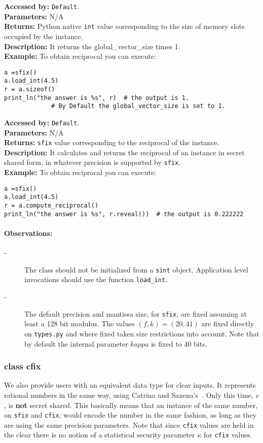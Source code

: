 		
			\textbf{Accessed by:} \verb|Default|.		 \\
			\textbf{Parameters:} N/A \\
			\textbf{Returns:}
				 Python native \verb|int| value corresponding to the size of memory slots occupied by the instance. \\
			\textbf{Description:}
				It returns the global_vector_size times 1. \\
	     	\textbf{Example:}
    		    To obtain reciprocal you can execute:
\begin{lstlisting}
a =sfix()
a.load_int(4.5)
r = a.sizeof()
print_ln("the answer is %s", r)  # the output is 1. 
             # By Default the global_vector_size is set to 1.    	
\end{lstlisting}	 
			\textbf{Accessed by:} \verb|Default|.		 \\
			\textbf{Parameters:} N/A \\
			\textbf{Returns:} \verb|sfix| value corresponding to the reciprocal of the instance. \\
			\textbf{Description:}
				It calculates and returns the reciprocal of an instance in secret shared form, 
				in whatever precision is supported by \verb|sfix|.\\
	     	\textbf{Example:}
    		    To obtain reciprocal you can execute:
\begin{lstlisting}
a =sfix()
a.load_int(4.5)
r = a.compute_reciprocal()
print_ln("the answer is %s", r.reveal())  # the output is 0.222222   	
\end{lstlisting}	 
	\paragraph{Observations:}
	\begin{description}
	\item[-] The class should not be initialized from a \verb|sint| object. 
    Application level invocations should use the function \verb|load_int|.
    \item[-] The default precision and mantissa size, for \verb|sfix|, are fixed assuming at least a 128 bit modulus. 
    The values $(f,k)=(20,41)$ are fixed directly on \verb|types.py| and where fixed taken size restrictions into account.
    Note that by default the internal parameter $kappa$ is fixed to $40$ bits. 
	\end{description}
	
\subsubsection{class cfix}
We also provide users with an equivalent data type for clear inputs. 
It represents rational numbers in the same way, using Catrina and Saxena's~\cite{CS10}.
Only this time, $v$, is \textbf{not} secret shared.  
This basically means that an instance of the same number, on \verb|sfix| and \verb|cfix|, 
would  encode the number in the same fashion, as long as they are using 
the same precision parameters.
Note that since \verb|cfix| values are held in the clear there is no notion
of a statistical security parameter $\kappa$ for \verb|cfix| values.

